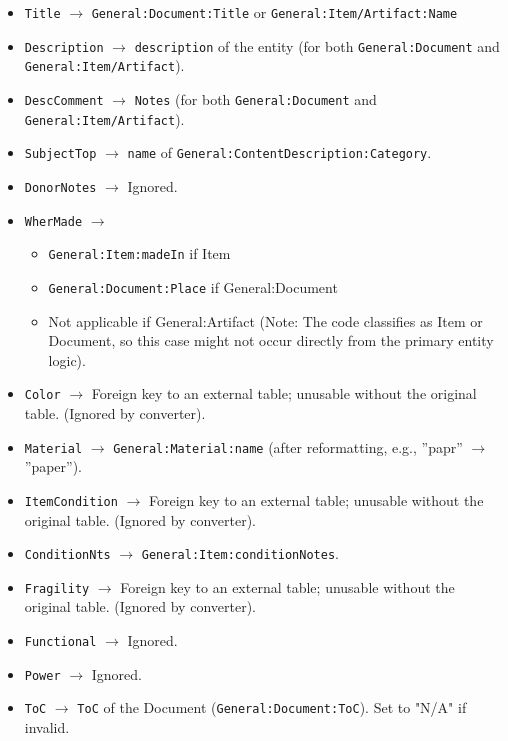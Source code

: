 \documentclass[11pt, a4paper]{article}
\begin{document}
\begin{itemize}
    \item \texttt{Title} $\rightarrow$ \texttt{General:Document:Title} or \texttt{General:Item/Artifact:Name}
    \item \texttt{Description} $\rightarrow$ \texttt{description} of the entity (for both \texttt{General:Document} and \texttt{General:Item/Artifact}).
    \item \texttt{DescComment} $\rightarrow$ \texttt{Notes} (for both \texttt{General:Document} and \texttt{General:Item/Artifact}).
    \item \texttt{SubjectTop} $\rightarrow$ \texttt{name} of \texttt{General:ContentDescription:Category}.
    \item \texttt{DonorNotes} $\rightarrow$ Ignored.
    \item \texttt{WherMade} $\rightarrow$
        \begin{itemize}
            \item \texttt{General:Item:madeIn} if Item
            \item \texttt{General:Document:Place} if General:Document
            \item Not applicable if General:Artifact (Note: The code classifies as Item or Document, so this case might not occur directly from the primary entity logic).
        \end{itemize}
    \item \texttt{Color} $\rightarrow$ Foreign key to an external table; unusable without the original table. (Ignored by converter).
    \item \texttt{Material} $\rightarrow$ \texttt{General:Material:name} (after reformatting, e.g., ”papr” $\rightarrow$ ”paper”).
    \item \texttt{ItemCondition} $\rightarrow$ Foreign key to an external table; unusable without the original table. (Ignored by converter).
    \item \texttt{ConditionNts} $\rightarrow$ \texttt{General:Item:conditionNotes}.
    \item \texttt{Fragility} $\rightarrow$ Foreign key to an external table; unusable without the original table. (Ignored by converter).
    \item \texttt{Functional} $\rightarrow$ Ignored.
    \item \texttt{Power} $\rightarrow$ Ignored.
    \item \texttt{ToC} $\rightarrow$ \texttt{ToC} of the Document (\texttt{General:Document:ToC}). Set to "N/A" if invalid.

\end{itemize}
\end{document}
